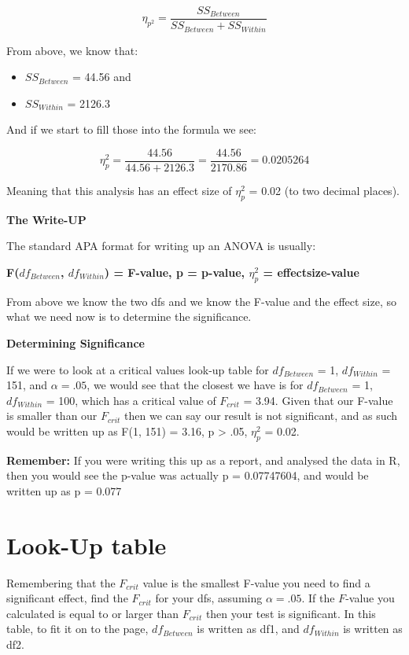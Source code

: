 \documentclass[
  oneside]{book}
\providecommand{\tightlist}{%
  \setlength{\itemsep}{0pt}\setlength{\parskip}{0pt}}
\begin{document}
\[\eta_{p^2} = \frac{SS_{Between}}{SS_{Between}+SS_{Within}}\]

From above, we know that:

\begin{itemize}
\tightlist
\item
  \(SS_{Between}\) = 44.56 and
\item
  \(SS_{Within}\) = 2126.3
\end{itemize}

And if we start to fill those into the formula we see:

\[\eta_p^2 = \frac{44.56}{44.56 + 2126.3} = \frac{44.56}{2170.86} = 0.0205264\]

Meaning that this analysis has an effect size of \(\eta_p^2\) = 0.02 (to two decimal places).

\textbf{The Write-UP}

The standard APA format for writing up an ANOVA is usually:

\textbf{F(\(df_{Between}\), \(df_{Within}\)) = F-value, p = p-value, \(\eta_p^2\) = effectsize-value}

From above we know the two dfs and we know the F-value and the effect size, so what we need now is to determine the significance.

\textbf{Determining Significance}

If we were to look at a critical values look-up table for \(df_{Between}\) = 1, \(df_{Within}\) = 151, and \(\alpha = .05\), we would see that the closest we have is for \(df_{Between}\) = 1, \(df_{Within}\) = 100, which has a critical value of \(F_{crit}\) = 3.94. Given that our F-value is smaller than our \(F_{crit}\) then we can say our result is not significant, and as such would be written up as F(1, 151) = 3.16, p \textgreater{} .05, \(\eta_p^2\) = 0.02.

\textbf{Remember:} If you were writing this up as a report, and analysed the data in R, then you would see the p-value was actually p = 0.07747604, and would be written up as p = 0.077

\hypertarget{look-up-table-3}{%
\section{Look-Up table}\label{look-up-table-3}}

Remembering that the \(F_{crit}\) value is the smallest F-value you need to find a significant effect, find the \(F_{crit}\) for your dfs, assuming \(\alpha = .05\). If the \(F\)-value you calculated is equal to or larger than \(F_{crit}\) then your test is significant. In this table, to fit it on to the page, \(df_{Between}\) is written as df1, and \(df_{Within}\) is written as df2.
\end{document}
